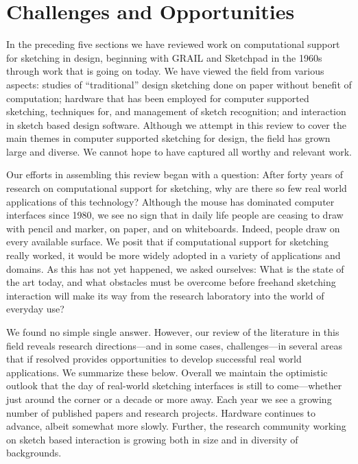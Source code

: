 \newpage
\chapter{Challenges and Opportunities}
\label{sec:summary}

In the preceding five sections we have reviewed work on computational
support for sketching in design, beginning with GRAIL and Sketchpad in
the 1960s through work that is going on today. We have viewed the
field from various aspects: studies of ``traditional'' design
sketching done on paper without benefit of computation; hardware that
has been employed for computer supported sketching, techniques for,
and management of sketch recognition; and interaction in sketch based
design software. Although we attempt in this review to cover the main
themes in computer supported sketching for design, the field has grown
large and diverse. We cannot hope to have captured all worthy and
relevant work.

Our efforts in assembling this review began with a question: After
forty years of research on computational support for sketching, why
are there so few real world applications of this technology? Although
the mouse has dominated computer interfaces since 1980, we see no sign
that in daily life people are ceasing to draw with pencil and marker,
on paper, and on whiteboards. Indeed, people draw on every available
surface. We posit that if computational support for sketching really
worked, it would be more widely adopted in a variety of applications
and domains. As this has not yet happened, we asked ourselves: What is
the state of the art today, and what obstacles must be overcome before
freehand sketching interaction will make its way from the research
laboratory into the world of everyday use?

We found no simple single answer. However, our review of the
literature in this field reveals research directions---and in some
cases, challenges---in several areas that if resolved provides
opportunities to develop successful real world applications. We
summarize these below. Overall we maintain the optimistic outlook that
the day of real-world sketching interfaces is still to come---whether
just around the corner or a decade or more away. Each year we see a
growing number of published papers and research projects. Hardware
continues to advance, albeit somewhat more slowly. Further, the
research community working on sketch based interaction is growing both
in size and in diversity of backgrounds.

